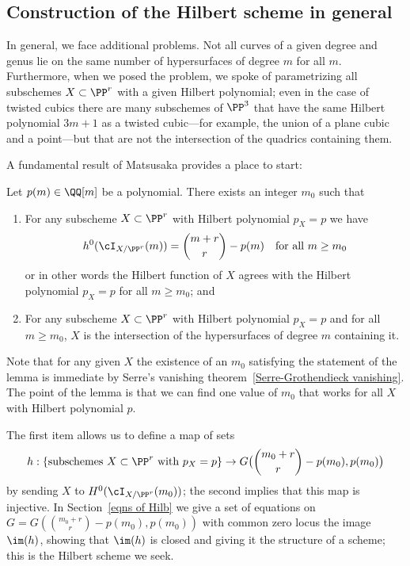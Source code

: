\subsection{Construction of the Hilbert scheme in general}

In general, we face additional problems. Not all curves of a given degree and genus lie on the same number of hypersurfaces of degree $m$ for all $m$. Furthermore, when we posed the problem, we spoke of parametrizing all subschemes $X \subset \PP^r$ with a given Hilbert polynomial; even in the case of twisted cubics there are many subschemes of $\PP^3$ that have the same Hilbert polynomial $3m+1$ as a twisted cubic---for example, the union of a plane cubic and a point---but that are not the intersection of the quadrics containing them.

A fundamental result of Matsusaka provides a place to start:

\begin{lemma}\label{matsusaka}
Let $p(m) \in \QQ[m]$ be a polynomial. There exists an integer $m_0$ such that

\begin{enumerate}  

\item For any subscheme $X \subset \PP^r$ with Hilbert polynomial $p_X = p$ we have
$$
h^0(\cI_{X/\PP^r}(m)) = \binom{m+r}{r} - p(m) \quad \text{for all } m \geq m_0
$$
or in other words the Hilbert function of $X$ agrees with the Hilbert polynomial $p_X = p$ for all $m \geq m_0$; and

\item For any subscheme $X \subset \PP^r$ with Hilbert polynomial $p_X = p$ and for all $m \geq m_0$, $X$ is the intersection of the hypersurfaces of degree $m$ containing it.
\end{enumerate}
\end{lemma}

Note that  for any given $X$ the existence of an $m_0$ satisfying the statement of the lemma is immediate by Serre's vanishing theorem~\ref{Serre-Grothendieck vanishing}. The point of the lemma is that we can find one value of $m_0$ that works for all $X$ with Hilbert polynomial $p$.

The first item allows us to define a  map of sets
$$
h : \left\{ \text{subschemes $X \subset \PP^r$ with $p_X=p$} \right\}  \to G\big(\binom{m_0+r}{r} - p(m_0), p(m_0)\big)
$$
by sending $X$ to $H^0(\cI_{X/\PP^r}(m_0))$; the second implies that this map is injective.  In Section~\ref{eqns of Hilb} we give a set of equations on $G = G(\binom{m_0+r}{r} - p(m_0), p(m_0))$ with common zero locus the image $\im(h)$, showing that $\im(h)$ is closed and giving it the structure of a scheme; this is the Hilbert scheme we seek.


